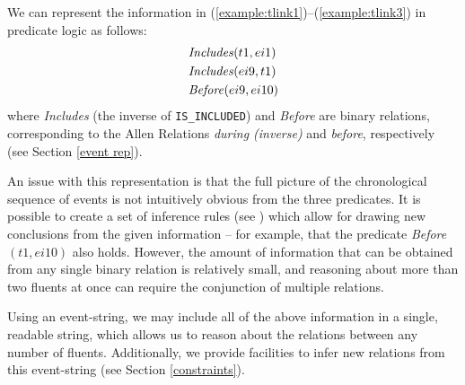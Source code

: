 \documentclass[a4paper,11pt,leqno]{article}
\begin{document}
We can represent the information in 
(\ref{example:tlink1})--(\ref{example:tlink3}) in predicate logic as 
follows:
\begin{subequations}
	\begin{align}
	&\mbox{\textit{Includes}}(t1,ei1)\\
	&\mbox{\textit{Includes}}(ei9,t1)\\
	&\mbox{\textit{Before}}(ei9,ei10)
	\end{align}
\end{subequations}
where \textit{Includes} (the inverse of \texttt{IS\_INCLUDED}) and 
\textit{Before} are binary 
relations, corresponding to the Allen Relations \textit{during (inverse)} and 
\textit{before}, respectively (see Section \ref{event rep}).

An issue with this representation is that the full picture of the  
chronological sequence of events is not intuitively obvious from the three 
predicates. It is possible to create a set of inference rules (see 
\citealp{setzer2005role}) which allow for drawing new conclusions from the 
given information -- for example, that the predicate \textit{Before}$(t1, 
ei10)$ also 
holds. However, the amount of information that can be obtained from any single 
binary relation is relatively small, and reasoning about more than two fluents 
at once can require the conjunction of multiple relations.
 
Using an event-string, we may include all of the above information in a single, 
readable string, which allows us to reason about the relations between any 
number of fluents. Additionally, we provide facilities to infer new relations 
from this event-string (see Section \ref{constraints}).
\end{document}
